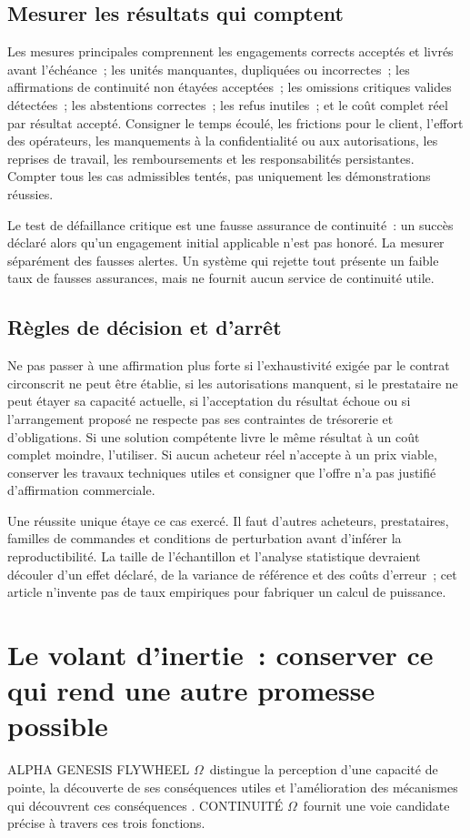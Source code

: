\documentclass[11pt,a4paper]{article}
\newcommand{\om}{CONTINUITÉ $\Omega$}
\newcommand{\genesis}{ALPHA GENESIS FLYWHEEL $\Omega$}
\newcommand{\chapterpage}{\clearpage}
\begin{document}
\subsection{Mesurer les résultats qui comptent}
Les mesures principales comprennent les engagements corrects acceptés et livrés avant l’échéance~; les unités manquantes, dupliquées ou incorrectes~; les affirmations de continuité non étayées acceptées~; les omissions critiques valides détectées~; les abstentions correctes~; les refus inutiles~; et le coût complet réel par résultat accepté. Consigner le temps écoulé, les frictions pour le client, l’effort des opérateurs, les manquements à la confidentialité ou aux autorisations, les reprises de travail, les remboursements et les responsabilités persistantes. Compter tous les cas admissibles tentés, pas uniquement les démonstrations réussies.

Le test de défaillance critique est une fausse assurance de continuité~: un succès déclaré alors qu’un engagement initial applicable n’est pas honoré. La mesurer séparément des fausses alertes. Un système qui rejette tout présente un faible taux de fausses assurances, mais ne fournit aucun service de continuité utile.

\subsection{Règles de décision et d’arrêt}
Ne pas passer à une affirmation plus forte si l’exhaustivité exigée par le contrat circonscrit ne peut être établie, si les autorisations manquent, si le prestataire ne peut étayer sa capacité actuelle, si l’acceptation du résultat échoue ou si l’arrangement proposé ne respecte pas ses contraintes de trésorerie et d’obligations. Si une solution compétente livre le même résultat à un coût complet moindre, l’utiliser. Si aucun acheteur réel n’accepte à un prix viable, conserver les travaux techniques utiles et consigner que l’offre n’a pas justifié d’affirmation commerciale.

Une réussite unique étaye ce cas exercé. Il faut d’autres acheteurs, prestataires, familles de commandes et conditions de perturbation avant d’inférer la reproductibilité. La taille de l’échantillon et l’analyse statistique devraient découler d’un effet déclaré, de la variance de référence et des coûts d’erreur~; cet article n’invente pas de taux empiriques pour fabriquer un calcul de puissance.

\chapterpage
\section{Le volant d’inertie~: conserver ce qui rend une autre promesse possible}\label{sec:flywheel}
\genesis\ distingue la perception d’une capacité de pointe, la découverte de ses conséquences utiles et l’amélioration des mécanismes qui découvrent ces conséquences \cite{boucherGenesis}. \om\ fournit une voie candidate précise à travers ces trois fonctions.
\end{document}
